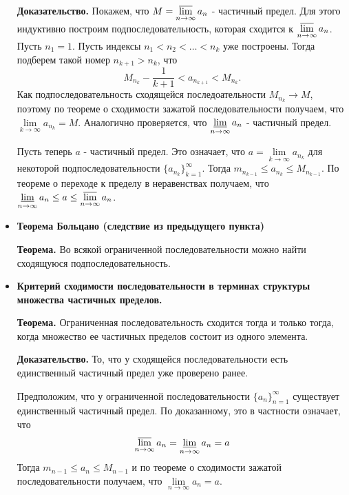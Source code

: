 \documentclass[12pt,a4paper]{article}
\begin{document}
\begin{itemize}
\textbf{Доказательство.} Покажем, что $M = \varlimsup\limits_{n \to \infty}{a_n}$ - частичный предел. Для этого индуктивно построим подпоследовательность, которая сходится к $\varlimsup\limits_{n \to \infty}{a_n}$. Пусть $n_1 = 1$. Пусть индексы $n_1 < n_2 < \ldots < n_k$ уже построены. Тогда подберем такой номер $n_{k+1} > n_k$, что 
\[
M_{n_k} - \frac{1}{k+1} < 
a_{n_{k+1}} < 
M_{n_k}.
\]
Как подпоследовательность сходящейся последоательности $M_{n_k} \to M$, поэтому по теореме о сходимости зажатой последовательности получаем, что $\lim\limits_{k \to \infty}{a_{n_k}} = M$. Аналогично проверяется, что $\varliminf\limits_{n \to \infty}{a_n}$ - частичный предел.

Пусть теперь $a$ - частичный предел. Это означает, что $a = \lim\limits_{k \to \infty}{a_{n_k}}$ для некоторой подпоследовательности $\{a_{n_k}\}_{k=1}^\infty$. Тогда $m_{n_{k-1}} \leq a_{n_k} \leq M_{n_{k-1}}$. По теореме о переходе к пределу в неравенствах получаем, что $\varliminf\limits_{n \to \infty}{a_n} \leq a \leq \varlimsup\limits_{n \to \infty}{a_n}$.

\item \textbf{Теорема Больцано (следствие из предыдущего пункта)} 

\textbf{Теорема.} 
Во всякой ограниченной последовательности можно найти сходящуюся подпоследовательность.

\item \textbf{Критерий сходимости последовательности в терминах структуры множества частичных пределов.}

\textbf{Теорема.} Ограниченная последовательность сходится тогда и только тогда, когда множество ее частичных пределов состоит из одного элемента.

\textbf{Доказательство.} То, что у сходящейся последовательности есть единственный частичный предел уже проверено ранее.

Предположим, что у ограниченной последовательности $\{a_n\}_{n=1}^\infty$ существует единственный частичный предел. По доказанному, это в частности означает, что 
\[
\varlimsup_{n \to \infty}{a_n} = 
\varliminf_{n \to \infty}{a_n} = 
a
\]
Тогда $m_{n-1} \leq a_n \leq M_{n-1}$ и по теореме о сходимости зажатой последовательности получаем, что $\lim\limits_{n \to \infty}{a_n} = a$.
\end{itemize}
\end{document}
